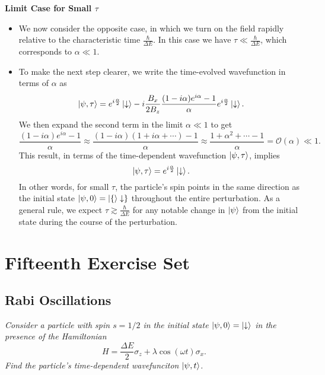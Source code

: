 \documentclass[11pt, a4paper]{article}
\newcommand{\Ham}{Hamiltonian\xspace}
\newcommand{\p}{\psi}  %
\newcommand{\da}{\downarrow}  %
\begin{document}
\textbf{Limit Case for Small $ \tau $ }
\begin{itemize}

	\item We now consider the opposite case, in which we turn on the field rapidly relative to the characteristic time $ \frac{\hbar}{\Delta E}  $. In this case we have $ \tau \ll \frac{\hbar}{\Delta E} $, which corresponds to $ \alpha \ll 1 $. 

    \item To make the next step clearer, we write the time-evolved wavefunction in terms of $ \alpha $ as 
    \begin{equation*}
        \ket{\p, \tau} = e^{i \frac{\alpha}{2} }\ket{\da} - i \frac{B_{x}}{2B_{z}} \frac{(1 - i \alpha)e^{i\alpha} - 1}{\alpha} e^{i \frac{\alpha}{2} }\ket{\da}.
    \end{equation*}
    We then expand the second term in the limit $ \alpha \ll 1 $ to get
	\begin{equation*}
		\frac{(1 - i\alpha)e^{i\alpha} - 1}{\alpha} \approx \frac{(1 - i \alpha)(1 + i \alpha + \cdots) - 1}{\alpha} \approx \frac{1 + \alpha^{2} + \cdots - 1}{\alpha} = \mathcal{O}(\alpha) \ll 1.
	\end{equation*}
    This result, in terms of the time-dependent wavefunction $ \ket{\p, \tau} $, implies
	\begin{equation*}
		\ket{\p, \tau} = e^{i\frac{\alpha}{2}}\ket{\da}.
	\end{equation*}
    In other words, for small $ \tau $, the particle's spin points in the same direction as the initial state $ \ket{\p, 0} = \ket\{\da\} $ throughout the entire perturbation. As a general rule, we expect $ \tau \gtrsim \frac{\hbar}{\Delta E} $ for any notable change in $ \ket{\p} $ from the initial state during the course of the perturbation.
\end{itemize}

\section{Fifteenth Exercise Set}

\subsection{Rabi Oscillations} 
\textit{Consider a particle with spin $ s = 1/2 $ in the initial state $ \ket{\p, 0} = \ket{\da} $ in the presence of the \Ham}
\begin{equation*}
    H = \frac{\Delta E}{2}\sigma_{z} + \lambda \cos (\omega t )\sigma_{x}.
\end{equation*}
\textit{Find the particle's time-dependent wavefunciton $ \ket{\p, t} $.}
\end{document}
